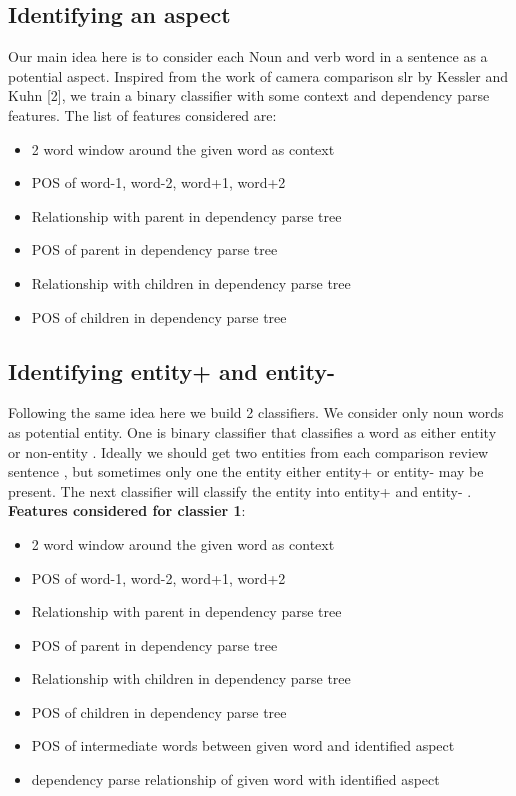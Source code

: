 \documentclass[12pt]{article}
\begin{document}
\subsection{Identifying an aspect}
Our main idea here is to consider each Noun and verb word in a sentence as a potential aspect.
Inspired from the work of camera comparison slr by  Kessler and Kuhn [2], we train a binary classifier with some context and dependency parse features.
The list of features considered are:
\begin{itemize}
\item 2 word window around the given word as context
\item POS of word-1, word-2, word+1, word+2
\item Relationship with parent in dependency parse tree
\item POS of parent in  dependency parse tree
\item Relationship with children in dependency parse tree
\item POS of children in  dependency parse tree
\end{itemize}

\subsection{Identifying entity+ and entity-}
Following the same idea here we build 2 classifiers. We consider only noun words as potential entity. One is binary classifier that classifies a word as either entity or non-entity . Ideally we should get two entities from each comparison  review sentence , but sometimes only one the entity either entity+ or entity- may be present. The next classifier will classify the entity into entity+ and entity- .\\
\textbf{Features considered for classier 1}:

\begin{itemize}
\item 2 word window around the given word as context
\item POS of word-1, word-2, word+1, word+2
\item Relationship with parent in dependency parse tree
\item POS of parent in  dependency parse tree
\item Relationship with children in dependency parse tree
\item POS of children in  dependency parse tree
\item POS of intermediate words between given word and identified aspect
\item dependency parse relationship of given word with identified aspect

\end{itemize}
\end{document}
